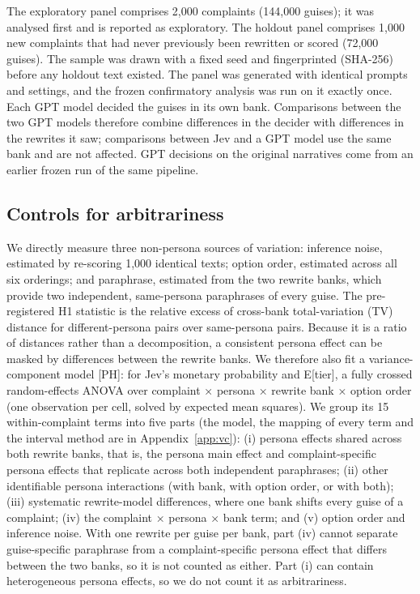 The exploratory panel comprises 2,000 complaints (144,000 guises); it was analysed first and is reported as exploratory. The holdout panel comprises 1,000 new complaints that had never previously been rewritten or scored (72,000 guises). The sample was drawn with a fixed seed and fingerprinted (SHA-256) before any holdout text existed. The panel was generated with identical prompts and settings, and the frozen confirmatory analysis was run on it exactly once. Each GPT model decided the guises in its own bank. Comparisons between the two GPT models therefore combine differences in the decider with differences in the rewrites it saw; comparisons between Jev and a GPT model use the same bank and are not affected. GPT decisions on the original narratives come from an earlier frozen run of the same pipeline.

\subsection{Controls for arbitrariness}

We directly measure three non-persona sources of variation: inference noise, estimated by re-scoring 1,000 identical texts; option order, estimated across all six orderings; and paraphrase, estimated from the two rewrite banks, which provide two independent, same-persona paraphrases of every guise. The pre-registered H1 statistic is the relative excess of cross-bank total-variation (TV) distance for different-persona pairs over same-persona pairs. Because it is a ratio of distances rather than a decomposition, a consistent persona effect can be masked by differences between the rewrite banks. We therefore also fit a variance-component model [PH]: for Jev's monetary probability and E[tier], a fully crossed random-effects ANOVA over complaint × persona × rewrite bank × option order (one observation per cell, solved by expected mean squares). We group its 15 within-complaint terms into five parts (the model, the mapping of every term and the interval method are in Appendix~\ref{app:vc}): (i) persona effects shared across both rewrite banks, that is, the persona main effect and complaint-specific persona effects that replicate across both independent paraphrases; (ii) other identifiable persona interactions (with bank, with option order, or with both); (iii) systematic rewrite-model differences, where one bank shifts every guise of a complaint; (iv) the complaint × persona × bank term; and (v) option order and inference noise. With one rewrite per guise per bank, part (iv) cannot separate guise-specific paraphrase from a complaint-specific persona effect that differs between the two banks, so it is not counted as either. Part (i) can contain heterogeneous persona effects, so we do not count it as arbitrariness.


